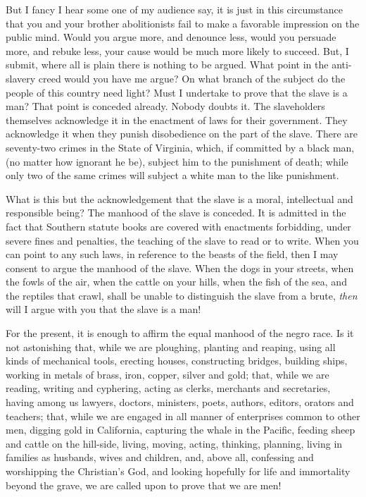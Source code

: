 But I fancy I hear some one of my audience say, it is just in this circumstance that you and your brother abolitionists fail to make a favorable impression on the public mind. Would you argue more, and denounce less, would you persuade more, and rebuke less, your cause would be much more likely to succeed. But, I submit, where all is plain there is nothing to be argued. What point in the anti-slavery creed would you have me argue? On what branch of the subject do the people of this country need light? Must I undertake to prove that the slave is a man? That point is conceded already. Nobody doubts it. The slaveholders themselves acknowledge it in the enactment of laws for their government. They acknowledge it when they punish disobedience on the part of the slave. There are seventy-two crimes in the State of Virginia, which, if committed by a black man, (no matter how ignorant he be), subject him to the punishment of death; while only two of the same crimes will subject a white man to the like punishment.\par

What is this but the acknowledgement that the slave is a moral, intellectual and responsible being? The manhood of the slave is conceded. It is admitted in the fact that Southern statute books are covered with enactments forbidding, under severe fines and penalties, the teaching of the slave to read or to write. When you can point to any such laws, in reference to the beasts of the field, then I may consent to argue the manhood of the slave. When the dogs in your streets, when the fowls of the air, when the cattle on your hills, when the fish of the sea, and the reptiles that crawl, shall be unable to distinguish the slave from a brute, \textit{then} will I argue with you that the slave is a man!\par

For the present, it is enough to affirm the equal manhood of the negro race. Is it not astonishing that, while we are ploughing, planting and reaping, using all kinds of mechanical tools, erecting houses, constructing bridges, building ships, working in metals of brass, iron, copper, silver and gold; that, while we are reading, writing and cyphering, acting as clerks, merchants and secretaries, having among us lawyers, doctors, ministers, poets, authors, editors, orators and teachers; that, while we are engaged in all manner of enterprises common to other men, digging gold in California, capturing the whale in the Pacific, feeding sheep and cattle on the hill-side, living, moving, acting, thinking, planning, living in families as husbands, wives and children, and, above all, confessing and worshipping the Christian’s God, and looking hopefully for life and immortality beyond the grave, we are called upon to prove that we are men!\par

